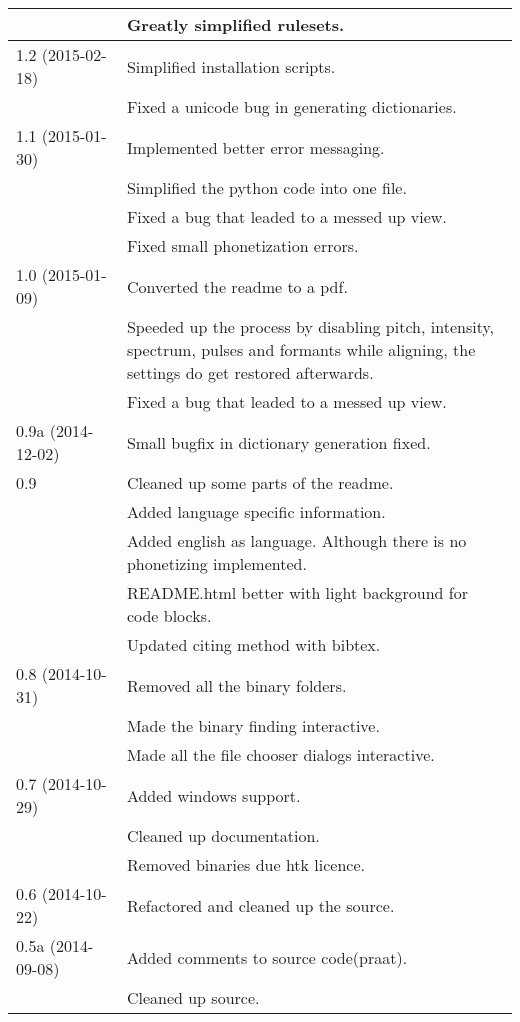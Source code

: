 \begin{longtable}{|p{0.22\linewidth}p{0.8\linewidth}|}
	 & \tabitem Greatly simplified rulesets.\\
	\hline
	1.2 (2015-02-18) & \tabitem Simplified installation scripts.\\
		& \tabitem Fixed a unicode bug in generating dictionaries.\\
	\hline
	1.1 (2015-01-30) & \tabitem Implemented better error messaging.\\
		& \tabitem Simplified the python code into one file.\\
		& \tabitem Fixed a bug that leaded to a messed up view.\\
		& \tabitem Fixed small phonetization errors.\\
	\hline
	1.0 (2015-01-09) & \tabitem Converted the readme to a pdf.\\
		& \tabitem Speeded up the process by disabling pitch, intensity,
spectrum, pulses and formants while aligning, the settings do get restored
afterwards.\\
		& \tabitem Fixed a bug that leaded to a messed up view.\\
	\hline
	0.9a (2014-12-02) & \tabitem Small bugfix in dictionary generation fixed.\\
	\hline
	0.9 & \tabitem Cleaned up some parts of the readme.\\
		& \tabitem Added language specific information.\\
		& \tabitem Added english as language. Although there is no phonetizing
implemented.\\
		& \tabitem README.html better with light background for code blocks.\\
		& \tabitem Updated citing method with bibtex.\\
	\hline
	0.8 (2014-10-31) & \tabitem Removed all the binary folders.\\
		& \tabitem Made the binary finding interactive.\\
		& \tabitem Made all the file chooser dialogs interactive.\\
	\hline
	0.7 (2014-10-29) & \tabitem Added windows support.\\
		&	\tabitem Cleaned up documentation.\\
		& \tabitem Removed binaries due htk licence.\\
	\hline
	0.6 (2014-10-22) & \tabitem Refactored and cleaned up the source.\\
	\hline
	0.5a (2014-09-08) & \tabitem Added comments to source code(praat).\\
		& \tabitem Cleaned up source.\\

\end{longtable}
